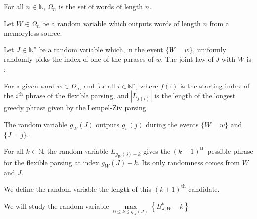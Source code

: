 

\begin{df}
For all $n\in\mathbb{N}$, $\Omega_n$ is the set 
of words of length $n$.
\end{df}

\begin{df}
Let $W \in \Omega_n$ be a random variable which outputs words of length $n$
from a memoryless source.
\end{df}

\begin{df}
Let $J \in \mathbb{N}^{\star}$ be a random
variable which, in the event $\{ W = w \}$,
uniformly randomly picks the index of
one of the phrases of $w$. 
The joint law of $J$ with $W$ is :

\end{df}

\begin{df}
For a given word $w\in\Omega_n$, 
and for all $i\in\mathbb{N}^{\star}$, 
where $f(i)$ is the starting index
of the $i^{\text{th}}$ phrase of the flexible parsing,
and $|L_{f(i)}|$ is the length of the longest greedy phrase
given by the Lempel-Ziv parsing.
\end{df}

\begin{df}
The random variable $g_W(J)$ outputs $g_w(j)$
during the events $\{ W=w \}$ and $\{ J = j \}$.
\end{df}

\begin{df}
For all $k \in \mathbb{N}$, the random variable $L_{g_W(J) - k}$ 
gives the $(k+1)^{\text{th}}$ possible phrase for the flexible 
parsing at index $g_W(J) - k$. Its only randomness comes from $W$
and $J$.
\end{df}


\begin{df}
    We define the random variable
    \noindent the length of this $(k+1)^{\text{th}}$ candidate.
\end{df}


\noindent
We will study the random variable
    {$ \underset{ 0 \leq k \leq g_W(J) }{ \max } 
                    \left\{ { B_{J, W}^k - k } \right\} $}

